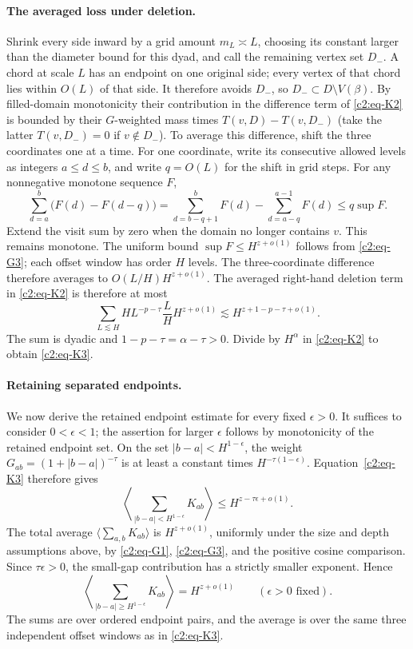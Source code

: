 \paragraph{The averaged loss under deletion.}
Shrink every side inward by a grid amount \(m_L\asymp L\), choosing its
constant larger than the diameter bound for this dyad, and call the
remaining vertex set \(D_-\). A chord at scale \(L\) has an endpoint on
one original side; every vertex of that chord lies within \(O(L)\) of
that side. It therefore avoids \(D_-\), so
\(D_-\subset D\setminus V(\beta)\). By filled-domain monotonicity their contribution in the difference term of \eqref{c2:eq-K2} is bounded by their \(G\)-weighted mass times \(T(v,D)-T(v,D_-)\) (take the latter \(T(v,D_-)=0\) if \(v\notin D_-\)). To average this difference, shift the three coordinates one at a time.
For one coordinate, write its consecutive allowed levels as integers
\(a\le d\le b\), and write \(q=O(L)\) for the shift in grid steps. For
any nonnegative monotone sequence \(F\),
\[
 \sum_{d=a}^b\big(F(d)-F(d-q)\big)
 =\sum_{d=b-q+1}^bF(d)-\sum_{d=a-q}^{a-1}F(d)
 \le q\sup F.
\]
Extend the visit sum by zero when the domain no longer contains \(v\).
This remains monotone. The uniform bound \(\sup F\le H^{z+o(1)}\) follows
from \eqref{c2:eq-G3}; each offset window has order \(H\) levels. The
three-coordinate difference therefore averages to
\(O(L/H)H^{z+o(1)}\). The averaged right-hand deletion term in \eqref{c2:eq-K2} is therefore
at most
\[
 \sum_{L\lesssim H} H L^{-p-\tau}\frac LH H^{z+o(1)}
 \lesssim H^{z+1-p-\tau+o(1)}.
\]
The sum is dyadic and \(1-p-\tau=\alpha-\tau>0\). Divide by
\(H^\alpha\) in \eqref{c2:eq-K2} to obtain \eqref{c2:eq-K3}.

\paragraph{Retaining separated endpoints.}
We now derive the retained endpoint estimate for every fixed $\epsilon>0$.
It suffices to consider $0<\epsilon<1$; the assertion for larger $\epsilon$
follows by monotonicity of the retained endpoint set.  On the set
$|b-a|<H^{1-\epsilon}$, the weight
$G_{ab}=(1+|b-a|)^{-\tau}$ is at least a constant times
$H^{-\tau(1-\epsilon)}$.  Equation~\eqref{c2:eq-K3} therefore gives
\[
 \left\langle\sum_{|b-a|<H^{1-\epsilon}}K_{ab}\right\rangle
 \le H^{z-\tau\epsilon+o(1)}.
\]
The total average $\langle\sum_{a,b}K_{ab}\rangle$ is $H^{z+o(1)}$,
uniformly under the size and depth assumptions above, by
\eqref{c2:eq-G1}, \eqref{c2:eq-G3}, and the positive cosine comparison.
Since $\tau\epsilon>0$, the small-gap contribution has a strictly smaller
exponent.  Hence
\begin{equation}
 \left\langle\sum_{|b-a|\ge H^{1-\epsilon}}K_{ab}\right\rangle
 =H^{z+o(1)}\qquad(\epsilon>0\text{ fixed}).
 \label{c2:eq-separated-supply}
\end{equation}
The sums are over ordered endpoint pairs, and the average is over the same
three independent offset windows as in \eqref{c2:eq-K3}.

